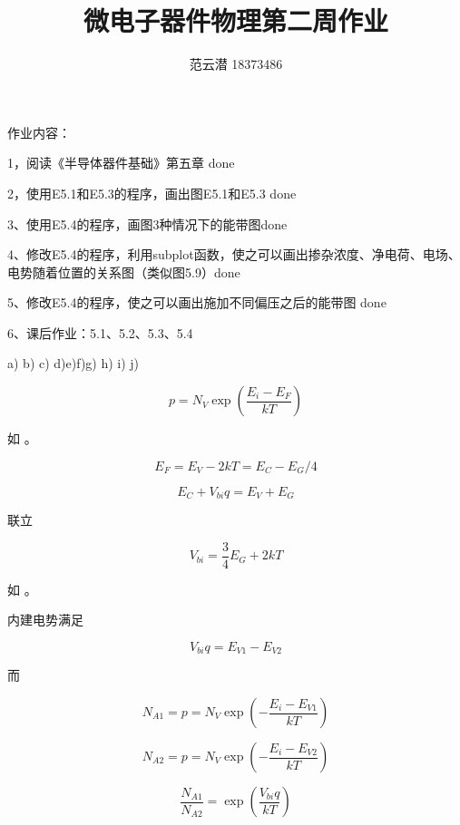 \documentclass[lang=cn,11pt,a4paper,cite=authoryear]{elegantpaper}
\title{微电子器件物理\quad 第二周作业}
\author{范云潜 18373486}
\institute{微电子学院 184111 班}
\date{\zhtoday}
\begin{document}
\maketitle

作业内容：

1，阅读《半导体器件基础》第五章 done

2，使用E5.1和E5.3的程序，画出图E5.1和E5.3 done

3、使用E5.4的程序，画图3种情况下的能带图done

4、修改E5.4的程序，利用subplot函数，使之可以画出掺杂浓度、净电荷、电场、电势随着位置的关系图（类似图5.9）done

5、修改E5.4的程序，使之可以画出施加不同偏压之后的能带图 done

6、课后作业：5.1、5.2、5.3、5.4

\tableofcontents





a) \XSolidBrush %
 b) \Checkmark c) \XSolidBrush d)\Checkmark e)\Checkmark f)\XSolidBrush g) \Checkmark h) \Checkmark i) \XSolidBrush j) \Checkmark 



\[p = N_V \exp(\frac{E_i-E_F}{kT})\]

如  。


\[E_F = E_V - 2 k T = E_C - E_G / 4\]

\[E_C + V_{bi} q = E_V + E_G\]

联立

\[V_{bi} = \frac{3}{4}E_G + 2 k T\]




如  。


内建电势满足

\[V_{bi} q = E_{V1} - E_{V2} \]

而 

\[N_{A1} = p = N_V \exp (- \frac{E_i - E_{V1}}{kT})\]

\[N_{A2} = p = N_V \exp (- \frac{E_i - E_{V2}}{kT})\]

\[\frac{N_{A1}}{N_{A2}} = \exp(\frac{V_{bi}q}{kT})\]
\end{document}
